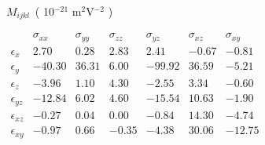 \documentclass[a4paper,10pt]{article}
\title{}
\author{}
\date{}
\begin{document}
\maketitle

\noindent

$M_{ijkl}$~( 10$^{-21}$ m$^{2}$V$^{-2}$ )

$
\begin{matrix}
               &\sigma_{xx} & \sigma_{yy} & \sigma_{zz} & \sigma_{yz} & \sigma_{xz} & \sigma_{xy} \\
 \epsilon_{x}  &   2.70 &    0.28 &    2.83 &    2.41 &   -0.67 &   -0.81 \\
 \epsilon_{y}  & -40.30 &   36.31 &    6.00 &  -99.92 &   36.59 &   -5.21 \\ 
 \epsilon_{z}  &  -3.96 &    1.10 &    4.30 &   -2.55 &    3.34 &   -0.60 \\
 \epsilon_{yz} & -12.84 &    6.02 &    4.60 &  -15.54 &   10.63 &   -1.90 \\
 \epsilon_{xz} &  -0.27 &    0.04 &    0.00 &   -0.84 &   14.30 &   -4.74 \\
 \epsilon_{xy} &  -0.97 &    0.66 &   -0.35 &   -4.38 &   30.06 &  -12.75 \\
\end{matrix}
$
\\
\end{document}
